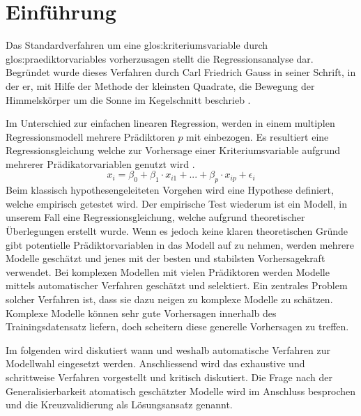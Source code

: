 \section{Einführung}
Das Standardverfahren um eine \Gls{glos:kriteriumsvariable} durch \Glspl{glos:praediktorvariable} vorherzusagen stellt die Regressionsanalyse dar.
Begründet wurde dieses Verfahren durch Carl Friedrich Gauss in seiner Schrift, in der er, mit Hilfe der Methode der kleinsten Quadrate, die Bewegung der Himmelskörper um die Sonne im Kegelschnitt beschrieb \cite{gauss1809theoria}. 

Im Unterschied zur einfachen linearen Regression, werden in einem multiplen Regressionsmodell mehrere Prädiktoren $p$ mit einbezogen. 
Es resultiert eine Regressionsgleichung welche zur Vorhersage einer Kriteriumsvariable aufgrund mehrerer Prädikatorvariablen genutzt wird  \cite[S. 448]{bortz2011}. 
\begin{equation}
x_i = \beta_0 + \beta_1\cdot x_{i1} + ... +  \beta_p\cdot x_{ip} + \epsilon_i
\tag{multiple lineare Regression}
\end{equation}
Beim klassisch hypothesengeleiteten Vorgehen wird eine Hypothese definiert, welche empirisch getestet wird.
Der empirische Test wiederum ist ein Modell, in unserem Fall eine Regressionsgleichung, welche aufgrund theoretischer Überlegungen erstellt wurde.
Wenn es jedoch keine klaren theoretischen Gründe gibt potentielle Prädiktorvariablen in das Modell auf zu nehmen, werden mehrere Modelle geschätzt und jenes mit der besten und stabilsten Vorhersagekraft verwendet.
Bei komplexen Modellen mit vielen Prädiktoren werden Modelle mittels automatischer Verfahren geschätzt und selektiert.
Ein zentrales Problem solcher Verfahren ist, dass sie dazu neigen zu komplexe Modelle zu schätzen. 
Komplexe Modelle können sehr gute Vorhersagen innerhalb des Trainingsdatensatz liefern, doch scheitern diese generelle Vorhersagen zu treffen.

Im folgenden wird diskutiert wann und weshalb automatische Verfahren zur Modellwahl eingesetzt werden. 
Anschliessend wird das exhaustive und schrittweise Verfahren vorgestellt und kritisch diskutiert.
Die Frage nach der Generalisierbarkeit atomatisch geschätzter Modelle wird im Anschluss besprochen und die Kreuzvalidierung als Lösungsansatz genannt.